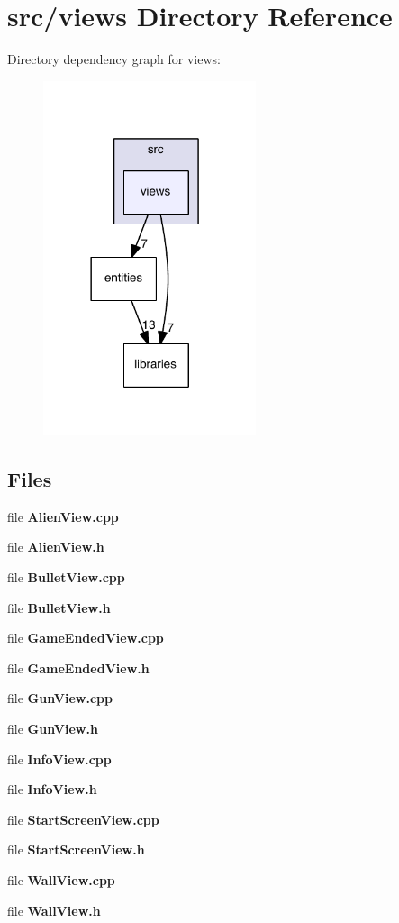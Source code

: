 \section{src/views Directory Reference}
\label{dir_1e071d60a48aca1189e1d43f5e2d0cd5}
Directory dependency graph for views\-:\nopagebreak
\begin{figure}[H]
\begin{center}
\leavevmode
\includegraphics[width=177pt]{dir_1e071d60a48aca1189e1d43f5e2d0cd5_dep}
\end{center}
\end{figure}
\subsection*{Files}
\begin{DoxyCompactItemize}
\item 
file {\bf Alien\-View.\-cpp}
\item 
file {\bf Alien\-View.\-h}
\item 
file {\bf Bullet\-View.\-cpp}
\item 
file {\bf Bullet\-View.\-h}
\item 
file {\bf Game\-Ended\-View.\-cpp}
\item 
file {\bf Game\-Ended\-View.\-h}
\item 
file {\bf Gun\-View.\-cpp}
\item 
file {\bf Gun\-View.\-h}
\item 
file {\bf Info\-View.\-cpp}
\item 
file {\bf Info\-View.\-h}
\item 
file {\bf Start\-Screen\-View.\-cpp}
\item 
file {\bf Start\-Screen\-View.\-h}
\item 
file {\bf Wall\-View.\-cpp}
\item 
file {\bf Wall\-View.\-h}
\end{DoxyCompactItemize}

